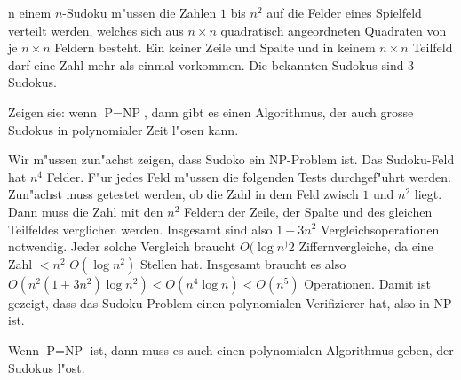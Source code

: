 n einem
$n$-Sudoku m"ussen die Zahlen $1$ bis $n^2$ auf die Felder eines
Spielfeld verteilt werden, welches sich aus $n\times n$ quadratisch
angeordneten Quadraten von je $n\times n$ Feldern besteht.
Ein keiner Zeile und Spalte und in keinem $n\times n$ Teilfeld
darf eine Zahl mehr als einmal vorkommen. Die bekannten Sudokus
sind 3-Sudokus.

Zeigen sie: wenn $\text{P}=\text{NP}$, dann gibt es einen Algorithmus,
der auch grosse Sudokus in polynomialer Zeit l"osen kann.

\begin{loesung}
Wir m"ussen zun"achst zeigen, dass Sudoko ein NP-Problem ist.
Das Sudoku-Feld hat $n^4$ Felder. F"ur jedes Feld m"ussen die
folgenden Tests durchgef"uhrt werden. Zun"achst muss getestet
werden, ob die Zahl in dem Feld zwisch $1$ und $n^2$ liegt.
Dann muss die Zahl mit den $n^2$ Feldern der Zeile, der Spalte
und des gleichen Teilfeldes verglichen werden. Insgesamt sind
also $1+3n^2$ Vergleichsoperationen notwendig. Jeder solche Vergleich
braucht $O(\log n^)2$ Ziffernvergleiche, da eine Zahl $<n^2$ $O(\log n^2)$
Stellen hat.
Insgesamt braucht es also $O(n^2(1+3n^2)\log n^2)< O(n^4\log n)<O(n^5)$
Operationen. Damit ist gezeigt, dass das Sudoku-Problem einen polynomialen
Verifizierer hat, also in NP ist.

Wenn $\text{P}=\text{NP}$ ist, dann muss es auch einen polynomialen
Algorithmus geben, der Sudokus l"ost.
\end{loesung}
